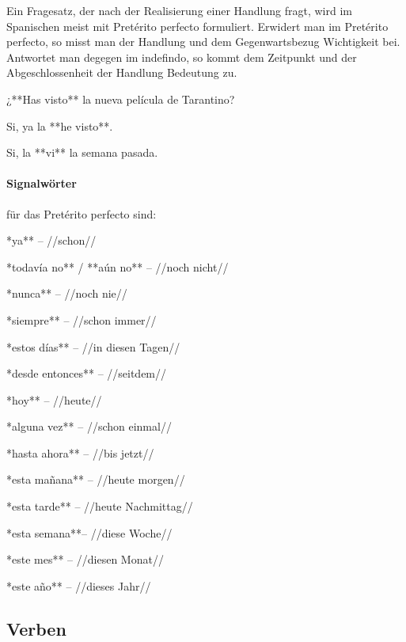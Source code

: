 Ein Fragesatz, der nach der Realisierung einer Handlung fragt, wird im Spanischen meist mit Pretérito perfecto
formuliert. Erwidert man im Pretérito perfecto, so misst man der Handlung und dem Gegenwartsbezug Wichtigkeit bei.
Antwortet man degegen im indefindo, so kommt dem Zeitpunkt und der Abgeschlossenheit der Handlung Bedeutung zu.

\begin{compactitem}
    \item ¿**Has visto** la nueva película de Tarantino?
    \begin{compactitem}
        \item Si, ya la **he visto**.
        \item Si, la **vi** la semana pasada.
    \end{compactitem}
\end{compactitem}


\paragraph{Signalwörter} für das Pretérito perfecto sind:

\begin{compactitem}
    \item **ya** -- //schon//
    \item **todavía no** / **aún no** -- //noch nicht//
    \item **nunca** -- //noch nie//
    \item **siempre** -- //schon immer//
    \item **estos días**  -- //in diesen Tagen//
    \item **desde entonces** -- //seitdem//
    \item **hoy** -- //heute//
    \item **alguna vez** -- //schon einmal//
    \item **hasta ahora** -- //bis jetzt//
    \item **esta mañana** -- //heute morgen//
    \item **esta tarde** -- //heute Nachmittag//
    \item **esta semana**-- //diese Woche//
    \item **este mes** -- //diesen Monat//
    \item **este año** -- //dieses Jahr//
\end{compactitem}

\subsection*{Verben}


